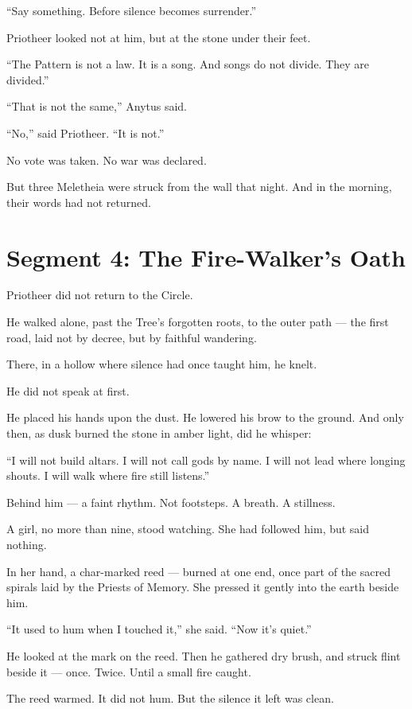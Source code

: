 \documentclass[10pt]{article}
\begin{document}
 “Say something. Before silence becomes surrender.”

Priotheer looked not at him,  
but at the stone under their feet.

 “The Pattern is not a law.  
 It is a song.  
 And songs do not divide.  
 They are divided.”

 “That is not the same,” Anytus said.

 “No,” said Priotheer. “It is not.”

No vote was taken.  
No war was declared.

But three Meletheia were struck from the wall that night.  
And in the morning, their words had not returned.

\newpage

\section*{Segment 4: The Fire-Walker's Oath}

Priotheer did not return to the Circle.

He walked alone, past the Tree’s forgotten roots,  
to the outer path — the first road, laid not by decree, but by faithful wandering.

There, in a hollow where silence had once taught him, he knelt.

He did not speak at first.

He placed his hands upon the dust.  
He lowered his brow to the ground.  
And only then, as dusk burned the stone in amber light, did he whisper:

 “I will not build altars.  
 I will not call gods by name.  
 I will not lead where longing shouts.  
 I will walk where fire still listens.”

Behind him — a faint rhythm.  
Not footsteps. A breath. A stillness.

A girl, no more than nine, stood watching.  
She had followed him, but said nothing.

In her hand, a char-marked reed — burned at one end,  
once part of the sacred spirals laid by the Priests of Memory.  
She pressed it gently into the earth beside him.

 “It used to hum when I touched it,” she said.  
 “Now it’s quiet.”

He looked at the mark on the reed.  
Then he gathered dry brush,  
and struck flint beside it —  
once.  
Twice.  
Until a small fire caught.

The reed warmed.  
It did not hum.  
But the silence it left was clean.
\end{document}
